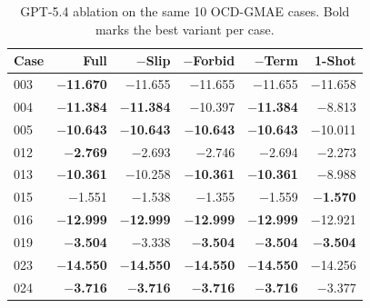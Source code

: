 \begin{table}[t]
\centering
\small
\caption{GPT-5.4 ablation on the same 10 OCD-GMAE cases. Bold marks the best variant per case.}
\label{tab:ocd-ablation-gpt54}
\begin{tabular}{lrrrrr}
\toprule
Case & Full & $-$Slip & $-$Forbid & $-$Term & 1-Shot \\
\midrule
003 & \textbf{$-$11.670} & $-$11.655 & $-$11.655 & $-$11.655 & $-$11.658 \\
004 & \textbf{$-$11.384} & \textbf{$-$11.384} & $-$10.397 & \textbf{$-$11.384} & $-$8.813 \\
005 & \textbf{$-$10.643} & \textbf{$-$10.643} & \textbf{$-$10.643} & \textbf{$-$10.643} & $-$10.011 \\
012 & \textbf{$-$2.769} & $-$2.693 & $-$2.746 & $-$2.694 & $-$2.273 \\
013 & \textbf{$-$10.361} & $-$10.258 & \textbf{$-$10.361} & \textbf{$-$10.361} & $-$8.988 \\
015 & $-$1.551 & $-$1.538 & $-$1.355 & $-$1.559 & \textbf{$-$1.570} \\
016 & \textbf{$-$12.999} & \textbf{$-$12.999} & \textbf{$-$12.999} & \textbf{$-$12.999} & $-$12.921 \\
019 & \textbf{$-$3.504} & $-$3.338 & \textbf{$-$3.504} & \textbf{$-$3.504} & \textbf{$-$3.504} \\
023 & \textbf{$-$14.550} & \textbf{$-$14.550} & \textbf{$-$14.550} & \textbf{$-$14.550} & $-$14.256 \\
024 & \textbf{$-$3.716} & \textbf{$-$3.716} & \textbf{$-$3.716} & \textbf{$-$3.716} & $-$3.377 \\
\bottomrule
\end{tabular}
\end{table}

